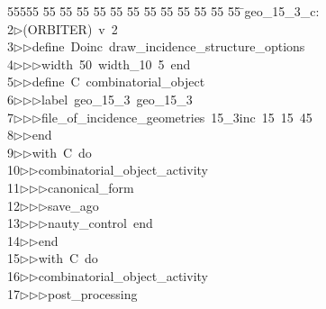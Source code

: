 %
%
\begin{tabbing}
55555 \= 55 \= 55 \= 55 \= 55 \= 55 \= 55 \= 55 \= 55 \= 55 \= 55 \= 55 \= 55 \= \>geo\_15\_3\_c:\\[0pt]
2\>$\triangleright$\>(ORBITER)\ v\ 2\ \\[0pt]
3\>$\triangleright$\>$\triangleright$\>define\ Doinc\ draw\_incidence\_structure\_options\ \\[0pt]
4\>$\triangleright$\>$\triangleright$\>$\triangleright$\>width\ 50\ width\_10\ 5\ end\ \\[0pt]
5\>$\triangleright$\>$\triangleright$\>define\ C\ combinatorial\_object\ \\[0pt]
6\>$\triangleright$\>$\triangleright$\>$\triangleright$\>label\ geo\_15\_3\ geo\_15\_3\ \\[0pt]
7\>$\triangleright$\>$\triangleright$\>$\triangleright$\>file\_of\_incidence\_geometries\ 15\_3inc\ 15\ 15\ 45\ \\[0pt]
8\>$\triangleright$\>$\triangleright$\>end\ \\[0pt]
9\>$\triangleright$\>$\triangleright$\>with\ C\ do\ \\[0pt]
10\>$\triangleright$\>$\triangleright$\>combinatorial\_object\_activity\ \\[0pt]
11\>$\triangleright$\>$\triangleright$\>$\triangleright$\>canonical\_form\ \\[0pt]
12\>$\triangleright$\>$\triangleright$\>$\triangleright$\>save\_ago\ \\[0pt]
13\>$\triangleright$\>$\triangleright$\>$\triangleright$\>nauty\_control\ end\ \\[0pt]
14\>$\triangleright$\>$\triangleright$\>end\ \\[0pt]
15\>$\triangleright$\>$\triangleright$\>with\ C\ do\ \\[0pt]
16\>$\triangleright$\>$\triangleright$\>combinatorial\_object\_activity\ \\[0pt]
17\>$\triangleright$\>$\triangleright$\>$\triangleright$\>post\_processing\ \\[0pt]

\end{tabbing}
